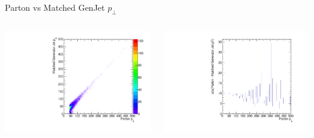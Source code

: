 \documentclass[8pt]{beamer}
\begin{document}
\begin{frame}{Parton vs Matched GenJet $p_\perp$}

\begin{block}
  
\begin{columns}

\includegraphics[width=\linewidth]{PartonvsGenJet_Pt.pdf}

\includegraphics[width=\linewidth]{Profile_PartonvsGenJet_DiffPt.pdf}

\end{columns}

\end{block}

\end{frame}
\end{document}
